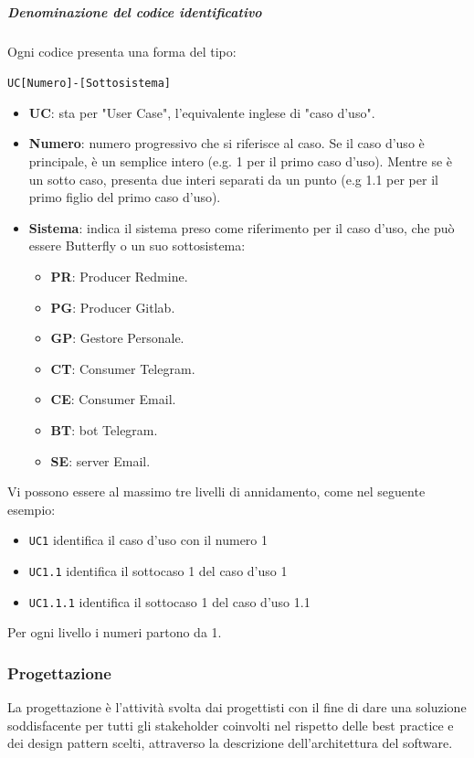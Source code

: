 		\subparagraph{Denominazione del codice identificativo}
		Ogni codice presenta una forma del tipo:
		\begin{center}
			\texttt{UC[Numero]-[Sottosistema]}
		\end{center}

		\begin{itemize}
			\item \textbf{UC}: sta per "User Case", l'equivalente inglese di "caso d'uso".
			\item \textbf{Numero}: numero progressivo che si riferisce al caso. Se il caso d'uso è principale, è un semplice intero (e.g. 1 per il primo caso d'uso). Mentre se è un sotto caso, presenta due interi separati da un punto (e.g 1.1 per per il primo figlio del primo caso d'uso).
			\item \textbf{Sistema}: indica il sistema preso come riferimento per il caso d'uso, che può essere Butterfly o un suo sottosistema:
			\begin{itemize}
				\item \textbf{PR}: Producer Redmine.
				\item \textbf{PG}: Producer Gitlab.
				\item \textbf{GP}: Gestore Personale.
				\item \textbf{CT}: Consumer Telegram.
				\item \textbf{CE}: Consumer Email.
				\item \textbf{BT}: bot Telegram.
				\item \textbf{SE}: server Email.
			\end{itemize}
		\end{itemize}

		Vi possono essere al massimo tre livelli di annidamento, come nel seguente esempio:
		\begin{itemize}
			\item \texttt{UC1} identifica il caso d'uso con il numero 1
			\item \texttt{UC1.1} identifica il sottocaso 1 del caso d'uso 1
			\item \texttt{UC1.1.1} identifica il sottocaso 1 del caso d'uso 1.1
		\end{itemize}
		Per ogni livello i numeri partono da 1.

        \subsubsection{Progettazione}\label{PP:Sviluppo:Progettazione}
        La progettazione è l'attività svolta dai progettisti con il fine di dare una soluzione soddisfacente per tutti gli stakeholder coinvolti nel rispetto delle best practice e dei design pattern scelti, attraverso la descrizione dell'architettura del software.

